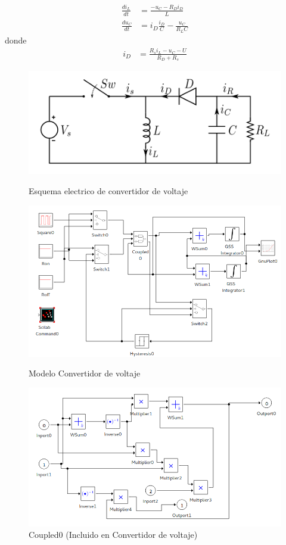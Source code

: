 \begin{align*}
\frac{di_{L}}{dt} & = \frac{-u_{C} - R_D i_D }{L}\\
\frac{du_C}{dt} & =i_D \frac{i_D}{C} - \frac{u_C}{R_L C }
\end{align*}
donde
\begin{align*}
i_D & = \frac{R_s i_L - u_C - U }{R_D + R_s}
\end{align*}


\begin{figure}[H]
\centering
 \includegraphics[width=.60\linewidth]{Buckboost_conventions}
 \label{buckdisk-squema}
 \caption{Esquema electrico de convertidor de voltaje}
\end{figure}

\begin{figure}[H]
\includegraphics[width=0.75\linewidth]{buck_disk}
 \label{model:buckdisk}
\caption{Modelo Convertidor de voltaje}
\end{figure}

\begin{figure}[H]
\includegraphics[width=0.75\linewidth]{buck_disk_coupled0}
\caption{Coupled0 (Incluido en Convertidor de voltaje)}
\label{model:buckdisk_coupled0}
\end{figure}

